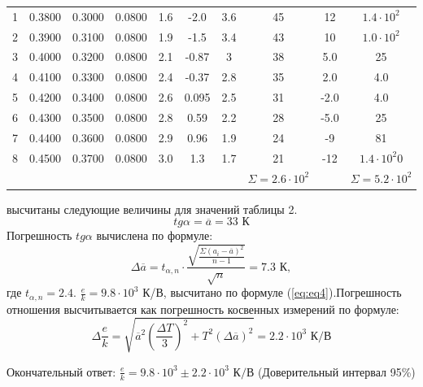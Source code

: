 \begin{center}
\begin{table}[H]
\begin{tabular}{|c|c|c|c|c|c|c|c|c|c|}
\begin{minipage}{21mm}
\end{minipage}\\
\hline
1 &  0.3800  &  0.3000  & 0.0800 & 1.6& -2.0&3.6 & 45 &12 & $1.4\cdot 10^2$\\
2 &  0.3900  &  0.3100  &  0.0800 & 1.9& -1.5&3.4 &43 &10 &$1.0\cdot 10^2$\\
3 &  0.4000  &  0.3200  & 0.0800  & 2.1& -0.87&3 &38&5.0 &25\\
4 & 0.4100  &  0.3300 &  0.0800 & 2.4& -0.37&2.8  &35 &2.0 &4.0\\
5 & 0.4200  &  0.3400  &  0.0800 &  2.6&0.095 &2.5 &31 &-2.0 &4.0  \\
6 & 0.4300  &  0.3500  &  0.0800 & 2.8&0.59 &2.2 &28 &-5.0 &25 \\
7 & 0.4400  &  0.3600  &  0.0800 & 2.9&0.96 &1.9 &24 &-9 & 81 \\
8 & 0.4500  &  0.3700  &  0.0800 & 3.0& 1.3 &1.7 &21 &-12 &$1.4\cdot 10^2$0  \\
 &   &    &   & &  & & $\Sigma=2.6\cdot 10^2$& & $\Sigma=5.2\cdot 10^2$ \\

\hline
\end{tabular}
\end{table}
\end{center}
 высчитаны следующие величины для значений таблицы 2.
\begin{equation}
    tg{\alpha}=\overline{a}=33 \text{ К}
\end{equation}
Погрешность $tg{\alpha}$ вычислена по формуле:
\begin{equation}
    \Delta\overline{a}=t_{\alpha,n}\cdot\frac{\sqrt{\frac{\Sigma(a_i-\overline{a})^2}{{n-1}}}}{\sqrt{n}}=7.3 \text{ К},
\end{equation}
где $t_{\alpha,n}=2.4$.
 $\frac{e}{k}=9.8\cdot10^3$ К/В, высчитано по формуле (\ref{eq:eq4}).Погрешность отношения высчитывается как погрешность косвенных измерений по формуле:
\begin{equation}
    \Delta\frac{e}{k}=\sqrt{\overline{a}^2(\frac{\Delta T}{3})^2+T^2(\Delta\overline{a})^2}=2.2\cdot10^3\text{ К/В}
\end{equation}
\par Окончательный ответ: $\frac{e}{k}=9.8\cdot10^3\pm2.2\cdot10^3\text{ К/В}$ (Доверительный интервал 95\%)

